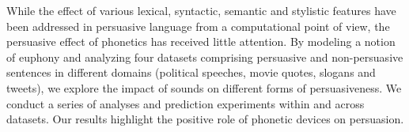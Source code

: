 While the effect of various lexical, syntactic, semantic and stylistic features have been addressed in persuasive language from a computational point of view, the persuasive effect of phonetics has received little attention. By modeling a notion of euphony and analyzing four datasets comprising persuasive and non-persuasive sentences in different domains (political speeches, movie quotes, slogans and tweets), we explore the impact of sounds on different forms of persuasiveness. We conduct a series of analyses and prediction experiments within and across datasets. Our results highlight the positive role of phonetic devices on persuasion.
